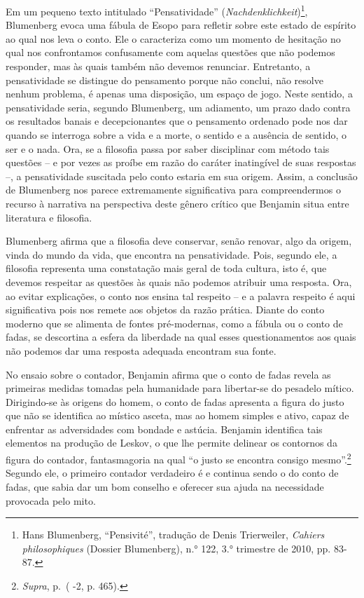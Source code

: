 Em um pequeno texto intitulado ``Pensatividade''
(\emph{Nachdenklichkeit})\footnote{Hans Blumenberg, ``Pensivité'',
  tradução de Denis Trierweiler, \emph{Cahiers philosophiques} (Dossier
  Blumenberg), n.° 122, 3.° trimestre de 2010, pp. 83-87.}, Blumenberg
evoca uma fábula de Esopo para refletir sobre este estado de espírito ao
qual nos leva o conto. Ele o caracteriza como um momento de hesitação no
qual nos confrontamos confusamente com aquelas questões que não podemos
responder, mas às quais também não devemos renunciar. Entretanto, a
pensatividade se distingue do pensamento porque não conclui, não resolve
nenhum problema, é apenas uma disposição, um espaço de jogo. Neste
sentido, a pensatividade seria, segundo Blumenberg, um adiamento, um
prazo dado contra os resultados banais e decepcionantes que o pensamento
ordenado pode nos dar quando se interroga sobre a vida e a morte, o
sentido e a ausência de sentido, o ser e o nada. Ora, se a filosofia
passa por saber disciplinar com método tais questões -- e por vezes as
proíbe em razão do caráter inatingível de suas respostas --, a
pensatividade suscitada pelo conto estaria em sua origem. Assim, a
conclusão de Blumenberg nos parece extremamente significativa para
compreendermos o recurso à narrativa na perspectiva deste gênero crítico
que Benjamin situa entre literatura e filosofia.

Blumenberg afirma que a filosofia deve conservar, senão renovar, algo da
origem, vinda do mundo da vida, que encontra na pensatividade. Pois,
segundo ele, a filosofia representa uma constatação mais geral de toda
cultura, isto é, que devemos respeitar as questões às quais não podemos
atribuir uma resposta. Ora, ao evitar explicações, o conto nos ensina
tal respeito -- e a palavra respeito é aqui significativa pois nos
remete aos objetos da razão prática. Diante do conto moderno que se
alimenta de fontes pré-modernas, como a fábula ou o conto de fadas, se
descortina a esfera da liberdade na qual esses questionamentos aos quais
não podemos dar uma resposta adequada encontram sua fonte.

No ensaio sobre o contador, Benjamin afirma que o conto de fadas revela
as primeiras medidas tomadas pela humanidade para libertar-se do
pesadelo mítico. Dirigindo-se às origens do homem, o conto de fadas
apresenta a figura do justo que não se identifica ao místico asceta, mas
ao homem simples e ativo, capaz de enfrentar as adversidades com bondade
e astúcia. Benjamin identifica tais elementos na produção de Leskov, o
que lhe permite delinear os contornos da figura do contador,
fantasmagoria na qual ``o justo se encontra consigo mesmo''.\footnote{\emph{Supra},
  p.\,\pageref{supra4} ( -2, p. 465).} Segundo ele, o primeiro contador verdadeiro é
e continua sendo o do conto de fadas, que sabia dar um bom conselho e
oferecer sua ajuda na necessidade provocada pelo mito.

